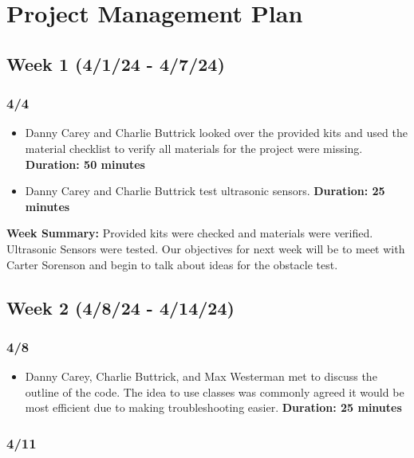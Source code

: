 \documentclass[11pt]{report}
\begin{document}
\SectionuseSubSectionSizing
\SubSectionuseSubSubSectionSizing
\setlength{\parindent}{0pt} %

\chapter{Project Management Plan}\label{ch:project-management-plan}

\section{Week 1 (4/1/24 - 4/7/24)}
\subsection*{4/4}

\begin{itemize}
    \item Danny Carey and Charlie Buttrick looked over the provided kits and used the material checklist to verify all materials for the project were missing. \textbf{Duration: 50 minutes}
    \item Danny Carey and Charlie Buttrick test ultrasonic sensors. \textbf{Duration: 25 minutes}
\end{itemize}

\textbf{Week Summary:} Provided kits were checked and materials were verified. Ultrasonic Sensors were tested. Our objectives for next week will be to meet with Carter Sorenson and begin to talk about ideas for the obstacle test.

\section{Week 2 (4/8/24 - 4/14/24)}
\subsection*{4/8}

\begin{itemize}
    \item Danny Carey, Charlie Buttrick, and Max Westerman met to discuss the outline of the code. The idea to use classes was commonly agreed it would be most efficient due to making troubleshooting easier. \textbf{Duration: 25 minutes}
\end{itemize}

\subsection*{4/11}
\end{document}

